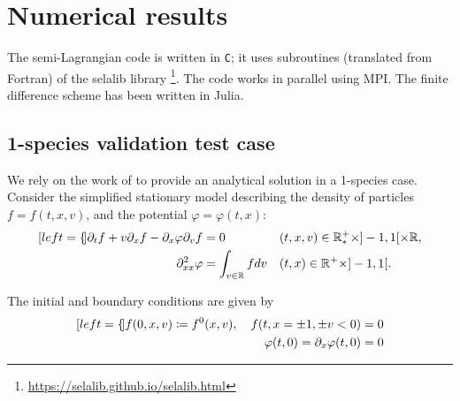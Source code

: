 \documentclass{article}
\numberwithin{equation}{section}
\newcommand{\R}{\mathbb{R}}
\newcommand{\todo}[1]{{\color{red}\textbf{#1}}}
\newcommand{\mysubeq}[2]{ %
	\begin{subequations}\label{#1}
		\begin{align}[left = {\empheqlbrace}]
			#2
		\end{align}
	\end{subequations}	
}
\begin{document}
%
%

\section{Numerical results}

The semi-Lagrangian code is written in \texttt{C}; it uses subroutines (translated from Fortran) of the selalib library \footnote{\url{https://selalib.github.io/selalib.html}}. The code works in parallel using MPI.
The finite difference scheme has been written in Julia.

\subsection{1-species validation test case}

We rely on the work of \cite{malkovNonstationaryAntonovSelfgravitating2020} to provide an analytical solution in a 1-species case. Consider the simplified stationary model describing the density of particles $f = f(t,x,v)$, and the potential $\varphi=\varphi(t,x)$:
\mysubeq{eq:one_species_model}{
	\partial_t f + v \partial_x f  - \partial_x \varphi \partial_v f &= 0 && (t,x,v) \in \R^+_* \times ]-1,1[ \times \mathbb{R}, \label{sta_1sp_f} \\
	\partial^2_{xx} \varphi &= \int_{v\in\mathbb{R}} f dv && (t,x) \in \R^+ \times ]-1,1[. \label{sta_phi}
}
The initial and boundary conditions are given by 
\mysubeq{eq:one_species_model_bc}{
	f(0,x,v) \coloneqq f^0(x,v), \quad f(t,x=\pm1, \pm v < 0) &= 0 \\
	\varphi(t,0) = \partial_x \varphi (t,0) &= 0 
}
\end{document}
